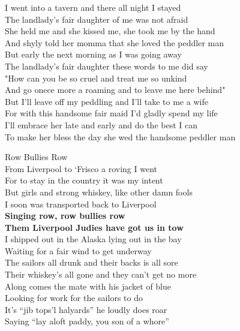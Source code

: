 \documentclass[letterpaper,9pt]{article}
\begin{document}
I went into a tavern and there all night I stayed \\
The landlady's fair daughter of me was not afraid \\
She held me and she kissed me, she took me by the hand \\
And shyly told her momma that she loved the peddler man \\

But early the next morning as I was going away \\
The landlady's fair daughter these words to me did say \\
"How can you be so cruel and treat me so unkind \\
And go onece more a roaming and to leave me here behind" \\

But I'll leave off my peddling and I'll take to me a wife \\
For with this handsome fair maid I'd gladly spend my life \\
I'll embrace her late and early and do the best I can \\
To make her bless the day she wed the handsome peddler man \\

\newpage
{}
\Huge
Row Bullies Row\\

\Large
From Liverpool to ‘Frisco a roving I went \\
For to stay in the country it was my intent \\
But girls and strong whiskey, like other damn fools \\
I soon was transported back to Liverpool \\
\textbf{Singing row, row bullies row \\
Them Liverpool Judies have got us in tow} \\

I shipped out in the Alaska lying out in the bay \\
Waiting for a fair wind to get underway \\
The sailors all drunk and their backs is all sore \\
Their whiskey’s all gone and they can’t get no more \\

Along comes the mate with his jacket of blue \\
Looking for work for the sailors to do \\
It’s “jib tops’l halyards” he loudly does roar \\
Saying “lay aloft paddy, you son of a whore” \\
\end{document}
